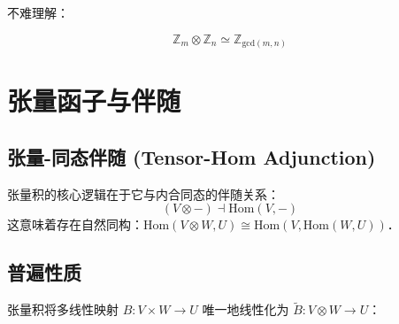 \documentclass[10pt, openany]{book}
\begin{document}
不难理解：

$$
\mathbb Z_m \otimes \mathbb Z_n \simeq \mathbb Z_{\text{gcd}(m,n)}​
$$

\begin{center}
\end{center}

\chapter{张量函子与伴随}

\section{张量-同态伴随 (Tensor-Hom Adjunction)}
张量积的核心逻辑在于它与内合同态的伴随关系：
\begin{equation}
(V \otimes -) \dashv \mathrm{Hom}(V, -)
\end{equation}
这意味着存在自然同构：$\mathrm{Hom}(V \otimes W, U) \cong \mathrm{Hom}(V, \mathrm{Hom}(W, U))$．

\section{普遍性质}
张量积将多线性映射 $B: V \times W \to U$ 唯一地线性化为 $\tilde{B}: V \otimes W \to U$：
\begin{center}
\end{center}
\end{document}
